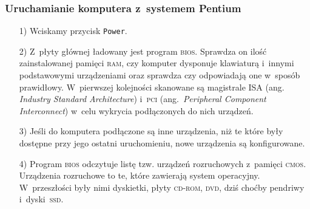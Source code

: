 \documentclass[10pt,t]{beamer}
\begin{document}
\begin{frame}
  \frametitle{Uruchamianie komputera z~systemem Pentium}


  \begin{itemize}

  \item[1)] Wciskamy przycisk \texttt{Power}.



  \item[2)] Z~płyty głównej ładowany jest program \textsc{bios}. Sprawdza on
    ilość zainstalowanej pamięci \textsc{ram}, czy komputer dysponuje
    klawiaturą i~innymi podstawowymi urządzeniami oraz sprawdza czy
    odpowiadają one w~sposób prawidłowy. W~pierwszej kolejności skanowane
    są magistrale \textsc{ISA} (ang. \textit{Industry Standard
      Architecture}) i~\textsc{pci} (ang.~\textit{Peripheral Component
      Interconnect}) w~celu wykrycia podłączonych do nich urządzeń.



  \item[3)] Jeśli do komputera podłączone są inne urządzenia, niż te które
    były dostępne przy jego ostatni uruchomieniu, nowe urządzenia są
    konfigurowane.



  \item[4)] Program \textsc{bios} odczytuje listę tzw. urządzeń rozruchowych
    z~pamięci \textsc{cmos}. Urządzenia rozruchowe to te, które zawierają
    system operacyjny. W~przeszłości były nimi dyskietki, płyty
    \textsc{cd}-\textsc{rom}, \textsc{dvd}, dziś choćby pendriwy
    i~dyski~\textsc{ssd}.

  \end{itemize}

\end{frame}
\end{document}
